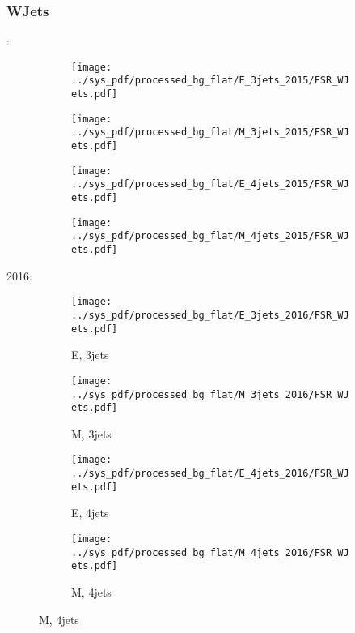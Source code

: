 \documentclass{beamer}
\begin{document}
\begin{frame}
\frametitle{WJets}
\fontsize{5}{1}:
\begin{figure}
\centering
\begin{subfigure}[b]{0.24\textwidth}
\texttt{[image: ../sys\_pdf/processed\_bg\_flat/E\_3jets\_2015/FSR\_WJets.pdf]}
\end{subfigure}
\begin{subfigure}[b]{0.24\textwidth}
\texttt{[image: ../sys\_pdf/processed\_bg\_flat/M\_3jets\_2015/FSR\_WJets.pdf]}
\end{subfigure}
\begin{subfigure}[b]{0.24\textwidth}
\texttt{[image: ../sys\_pdf/processed\_bg\_flat/E\_4jets\_2015/FSR\_WJets.pdf]}
\end{subfigure}
\begin{subfigure}[b]{0.24\textwidth}
\texttt{[image: ../sys\_pdf/processed\_bg\_flat/M\_4jets\_2015/FSR\_WJets.pdf]}
\end{subfigure}
\end{figure}
2016:
\begin{figure}
\centering
\begin{subfigure}[b]{0.24\textwidth}
\texttt{[image: ../sys\_pdf/processed\_bg\_flat/E\_3jets\_2016/FSR\_WJets.pdf]}
\captionsetup{font=tiny}
\caption{E, 3jets}
\end{subfigure}
\begin{subfigure}[b]{0.24\textwidth}
\texttt{[image: ../sys\_pdf/processed\_bg\_flat/M\_3jets\_2016/FSR\_WJets.pdf]}
\captionsetup{font=tiny}
\caption{M, 3jets}
\end{subfigure}
\begin{subfigure}[b]{0.24\textwidth}
\texttt{[image: ../sys\_pdf/processed\_bg\_flat/E\_4jets\_2016/FSR\_WJets.pdf]}
\captionsetup{font=tiny}
\caption{E, 4jets}
\end{subfigure}
\begin{subfigure}[b]{0.24\textwidth}
\texttt{[image: ../sys\_pdf/processed\_bg\_flat/M\_4jets\_2016/FSR\_WJets.pdf]}
\captionsetup{font=tiny}
\caption{M, 4jets}
\end{subfigure}
\end{figure}
\end{frame}
\end{document}
